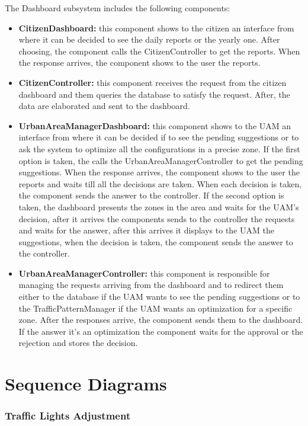 \documentclass[12pt, a4paper, twoside, openright]{report}
\begin{document}
The Dashboard subsystem includes the following components:

\begin{itemize}
\item
  \textbf{CitizenDashboard:} this component shows to the citizen an
  interface from where it can be decided to see the daily reports or the
  yearly one. After choosing, the component calls the CitizenController
  to get the reports. When the response arrives, the component shows to
  the user the reports.
\item
  \textbf{CitizenController:} this component receives the request from
  the citizen dashboard and them queries the database to satisfy the
  request. After, the data are elaborated and sent to the dashboard.
\item
  \textbf{UrbanAreaManagerDashboard:} this component shows to the UAM an
  interface from where it can be decided if to see the pending
  suggestions or to ask the system to optimize all the configurations in
  a precise zone. If the first option is taken, the calls the
  UrbanAreaManagerController to get the pending suggestions. When the
  response arrives, the component shows to the user the reports and
  waits till all the decisions are taken. When each decision is taken,
  the component sends the answer to the controller. If the second option
  is taken, the dashboard presents the zones in the area and waits for
  the UAM's decision, after it arrives the components sends to the
  controller the requests and waits for the answer, after this arrives
  it displays to the UAM the suggestions, when the decision is taken,
  the component sends the answer to the controller.
\item
  \textbf{UrbanAreaManagerController:} this component is responsible for
  managing the requests arriving from the dashboard and to redirect them
  either to the database if the UAM wants to see the pending suggestions
  or to the TrafficPatternManager if the UAM wants an optimization for a
  specific zone. After the responses arrive, the component sends them to
  the dashboard. If the answer it's an optimization the component waits
  for the approval or the rejection and stores the decision.
\end{itemize}
  
\section{Sequence Diagrams}
\subsubsection{Traffic Lights Adjustment}
\end{document}
